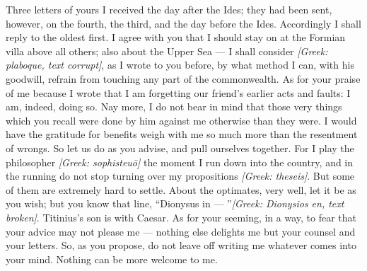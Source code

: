 

 Three letters of yours I received the day after the Ides; they had been sent, however, on the fourth, the third, and the day before the Ides. Accordingly I shall reply to the oldest first. I agree with you that I should stay on at the Formian villa above all others; also about the Upper Sea --- I shall consider \textit{[Greek: plaboque, text corrupt]}, as I wrote to you before, by what method I can, with his goodwill, refrain from touching any part of the commonwealth. As for your praise of me because I wrote that I am forgetting our friend's earlier acts and faults: I am, indeed, doing so. Nay more, I do not bear in mind that those very things which you recall were done by him against me otherwise than they were. I would have the gratitude for benefits weigh with me so much more than the resentment of wrongs. So let us do as you advise, and pull ourselves together. For I play the philosopher \textit{[Greek: sophisteu\=o]} the moment I run down into the country, and in the running do not stop turning over my propositions \textit{[Greek: theseis]}. But some of them are extremely hard to settle. About the optimates, very well, let it be as you wish; but you know that line, ``Dionysus in --- ''\textit{[Greek: Dionysios en, text broken]}. Titinius's son is with Caesar. As for your seeming, in a way, to fear that your advice may not please me --- nothing else delights me but your counsel and your letters. So, as you propose, do not leave off writing me whatever comes into your mind. Nothing can be more welcome to me.

